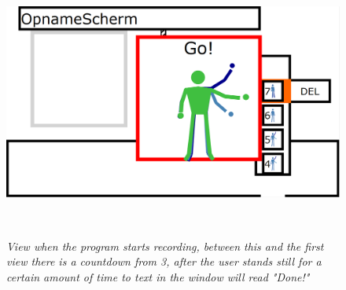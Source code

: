 \begin{figure}[H]
	\begin{center}
		\includegraphics[width=16cm, height=9cm]{figures/6_record_start.png}
		\caption{\emph{View when the program starts recording, between this and the first view there is a countdown from 3, after the user stands still for a certain amount of time to text in the window will read "Done!"}}
		\label{The regular view of the end design of the UI}
	\end{center}
\end{figure}

